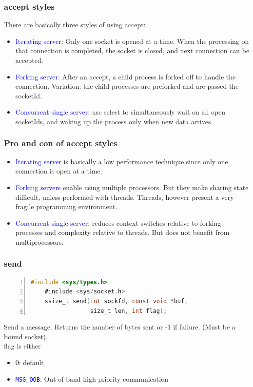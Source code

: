 \documentclass[12pt]{beamer}
\begin{document}
\begin{frame}
	\frametitle{accept styles}
	{\footnotesize
	There are basically three styles of using accept:
	\begin{itemize}
		\item \textcolor{blue}{Iterating server:} Only one socket is opened at a time. When the processing on that connection is completed, the socket is closed, and next connection can be accepted.
		\item \textcolor{blue}{Forking server}: After an accept, a child process is forked off to handle the connection. Variation: the child processes are preforked and are passed the socketId.
		\item \textcolor{blue}{Concurrent single server}: use select to simultaneously wait on all open socketIds, and waking up the process only when new data arrives.
	\end{itemize}
	}
\end{frame}

\begin{frame}
	\frametitle{Pro and con of accept styles}
	{\footnotesize

	\begin{itemize}
		\item \textcolor{blue}{Iterating server} is basically a low performance technique since
only one connection is open at a time.
		\item \textcolor{blue}{Forking servers} enable using multiple processors. But they
make sharing state difficult, unless performed with threads.
Threads, however present a very fragile programming
environment.
		\item \textcolor{blue}{Concurrent single server}: reduces context switches relative to
forking processes and complexity relative to threads. But does
not benefit from multiprocessors.
	\end{itemize}
	}
\end{frame}

\begin{frame}[fragile]
	\frametitle{send}
	{\tiny
	\begin{lstlisting}[language=C, breaklines=true, commentstyle=\color{mygreen},frame=lrtb,  rulecolor=\color{black}, numbers=left,  numbersep=5pt, numberstyle=\tiny\color{mygray}]
	#include <sys/types.h>
	#include <sys/socket.h>
	ssize_t send(int sockfd, const void *buf, 
	             size_t len, int flag);
	\end{lstlisting}}
	{\footnotesize
	Send a message. Returns the number of bytes sent or -1 if failure. (Must be a bound socket). \\ flag is either
	\begin{itemize}
	\item 0: default
	\item \texttt{\textcolor{blue}{MSG\_OOB}}: Out-of-band high priority communication	
	\end{itemize}
	}
\end{frame}
\end{document}
